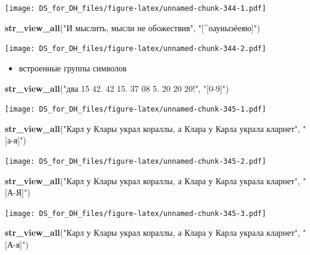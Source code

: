 \documentclass[
]{book}
\newenvironment{Shaded}{\begin{snugshade}}{\end{snugshade}}
\newcommand{\KeywordTok}[1]{\textcolor[rgb]{0.13,0.29,0.53}{\textbf{#1}}}
\newcommand{\NormalTok}[1]{#1}
\newcommand{\StringTok}[1]{\textcolor[rgb]{0.31,0.60,0.02}{#1}}
\providecommand{\tightlist}{%
  \setlength{\itemsep}{0pt}\setlength{\parskip}{0pt}}
\begin{document}
\texttt{[image: DS\_for\_DH\_files/figure-latex/unnamed-chunk-344-1.pdf]}

\begin{Shaded}
\begin{Highlighting}[]
\KeywordTok{str_view_all}\NormalTok{(}\StringTok{"И мыслить, мысли не обожествив"}\NormalTok{, }\StringTok{"[^оауиыэёеяю]"}\NormalTok{)}
\end{Highlighting}
\end{Shaded}

\texttt{[image: DS\_for\_DH\_files/figure-latex/unnamed-chunk-344-2.pdf]}

\begin{itemize}
\tightlist
\item
  встроенные группы символов
\end{itemize}

\begin{Shaded}
\begin{Highlighting}[]
\KeywordTok{str_view_all}\NormalTok{(}\StringTok{"два 15 42. 42 15. 37 08 5. 20 20 20!"}\NormalTok{, }\StringTok{"[0-9]"}\NormalTok{)}
\end{Highlighting}
\end{Shaded}

\texttt{[image: DS\_for\_DH\_files/figure-latex/unnamed-chunk-345-1.pdf]}

\begin{Shaded}
\begin{Highlighting}[]
\KeywordTok{str_view_all}\NormalTok{(}\StringTok{"Карл у Клары украл кораллы, а Клара у Карла украла кларнет"}\NormalTok{, }\StringTok{"[а-я]"}\NormalTok{)}
\end{Highlighting}
\end{Shaded}

\texttt{[image: DS\_for\_DH\_files/figure-latex/unnamed-chunk-345-2.pdf]}

\begin{Shaded}
\begin{Highlighting}[]
\KeywordTok{str_view_all}\NormalTok{(}\StringTok{"Карл у Клары украл кораллы, а Клара у Карла украла кларнет"}\NormalTok{, }\StringTok{"[А-Я]"}\NormalTok{)}
\end{Highlighting}
\end{Shaded}

\texttt{[image: DS\_for\_DH\_files/figure-latex/unnamed-chunk-345-3.pdf]}

\begin{Shaded}
\begin{Highlighting}[]
\KeywordTok{str_view_all}\NormalTok{(}\StringTok{"Карл у Клары украл кораллы, а Клара у Карла украла кларнет"}\NormalTok{, }\StringTok{"[А-я]"}\NormalTok{)}
\end{Highlighting}
\end{Shaded}
\end{document}
